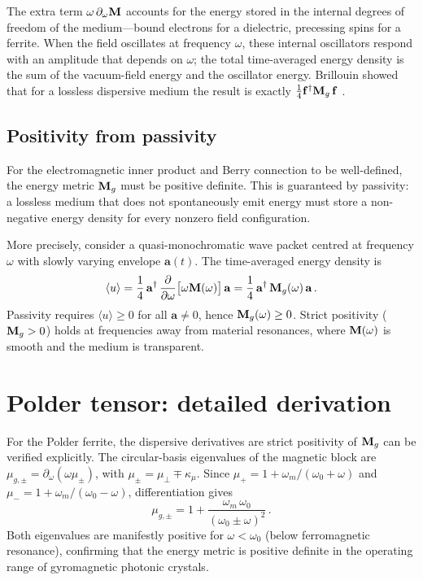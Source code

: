 The extra term $\omega\,\partial_\omega\mathbf{M}$ accounts for the energy
stored in the internal degrees of freedom of the medium---bound
electrons for a dielectric, precessing spins for a ferrite.  When the
field oscillates at frequency $\omega$, these internal oscillators
respond with an amplitude that depends on $\omega$; the total
time-averaged energy density is the sum of the vacuum-field energy and
the oscillator energy.  Brillouin showed that for a lossless dispersive
medium the result is exactly $\frac{1}{4}\mathbf{f}^\dagger\mathbf{M}_g\,\mathbf{f}$
\cite{gangaraj2016berry}.

\subsection{Positivity from passivity}
\label{sec:appD-Mg-positivity}

For the electromagnetic inner product and Berry connection to be
well-defined, the energy metric $\mathbf{M}_g$ must be positive definite.
This is guaranteed by passivity: a lossless medium that does not
spontaneously emit energy must store a non-negative energy density
for every nonzero field configuration.

More precisely, consider a quasi-monochromatic wave packet centred at
frequency $\omega$ with slowly varying envelope $\mathbf{a}(t)$.  The
time-averaged energy density is
\begin{equation}\label{eq:appD-energy-density}
  \langle u\rangle
  = \frac{1}{4}\,\mathbf{a}^\dagger\,
  \frac{\partial }{\partial \omega}\bigl[\omega\mathbf{M}(\omega)\bigr]\,\mathbf{a}
  = \frac{1}{4}\,\mathbf{a}^\dagger\,\mathbf{M}_g(\omega)\,\mathbf{a}\,.
\end{equation}
Passivity requires $\langle u\rangle\geq 0$ for all $\mathbf{a}\neq 0$,
hence $\mathbf{M}_g(\omega)\geq 0$.  Strict positivity ($\mathbf{M}_g>0$) holds
at frequencies away from material resonances, where $\mathbf{M}(\omega)$ is
smooth and the medium is transparent.

\section{Polder tensor: detailed derivation}
\label{sec:appD-polder-detailed}

For the Polder ferrite, the dispersive derivatives are
\cite{gangaraj2016berry} strict positivity of $\mathbf{M}_g$ can be verified
explicitly.  The circular-basis eigenvalues of the magnetic block are
$\mu_{g,\pm}=\partial_\omega(\omega\mu_\pm)$, with $\mu_\pm=\mu_\perp\mp\kappa_\mu$.
Since $\mu_+=1+\omega_m/(\omega_0+\omega)$ and
$\mu_-=1+\omega_m/(\omega_0-\omega)$, differentiation gives
\begin{equation}\label{eq:appD-Mg-ferrite-eigenvalues}
  \mu_{g,\pm}
  = 1 + \frac{\omega_m\,\omega_0}{(\omega_0\pm\omega)^2}\,.
\end{equation}
Both eigenvalues are manifestly positive for $\omega<\omega_0$ (below
ferromagnetic resonance), confirming that the energy metric is positive
definite in the operating range of gyromagnetic photonic crystals.

